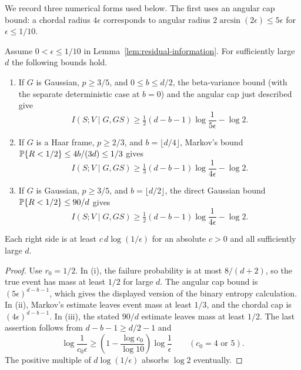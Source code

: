We record three numerical forms used below. The first uses an angular
cap bound: a chordal radius $4\epsilon$ corresponds to angular radius
$2\arcsin(2\epsilon)\le5\epsilon$ for $\epsilon\le1/10$.

\begin{corollary}\label{cor:replica-endpoints}
Assume $0<\epsilon\le1/10$ in Lemma~\ref{lem:residual-information}.
For sufficiently large $d$ the following bounds hold.
\begin{enumerate}[label=(\roman*)]
\item If $G$ is Gaussian, $p\ge3/5$, and $0\le b\le d/2$, the beta-variance bound (with
the separate deterministic case at $b=0$) and the angular cap just described
give
\begin{equation}\label{eq:endpoint-gaussian}
 I(S;V\mid G,GS)\ge
 \tfrac12(d-b-1)\log\frac1{5\epsilon}-\log2.
\end{equation}
\item If $G$ is a Haar frame, $p\ge2/3$, and $b=\lfloor d/4\rfloor$, Markov's bound
$\mathbb P\{R<1/2\}\le4b/(3d)\le1/3$ gives
\begin{equation}\label{eq:endpoint-haar}
 I(S;V\mid G,GS)\ge
 \tfrac13(d-b-1)\log\frac1{4\epsilon}-\log2.
\end{equation}
\item If $G$ is Gaussian, $p\ge3/5$, and $b=\lfloor d/2\rfloor$, the direct Gaussian bound
$\mathbb P\{R<1/2\}\le90/d$ gives
\begin{equation}\label{eq:endpoint-bins}
 I(S;V\mid G,GS)\ge
 \tfrac12(d-b-1)\log\frac1{4\epsilon}-\log2.
\end{equation}
\end{enumerate}
Each right side is at least $c\,d\log(1/\epsilon)$ for an absolute $c>0$
and all sufficiently large $d$.
\end{corollary}

\begin{proof}
Use $r_0=1/2$. In (i), the failure probability is at most $8/(d+2)$, so
the true event has mass at least $1/2$ for large $d$. The angular cap bound
is $(5\epsilon)^{d-b-1}$, which gives the displayed version of the binary
entropy calculation. In (ii), Markov's estimate leaves event mass at least
$1/3$, and the chordal cap is $(4\epsilon)^{d-b-1}$. In (iii), the stated
$90/d$ estimate leaves mass at least $1/2$. The last assertion follows from
$d-b-1\ge d/2-1$ and
\[
 \log\frac1{c_0\epsilon}\ge
 \left(1-\frac{\log c_0}{\log10}\right)\log\frac1\epsilon
 \qquad(c_0=4\text{ or }5).
\]
The positive multiple of $d\log(1/\epsilon)$ absorbs $\log2$ eventually.
\end{proof}

